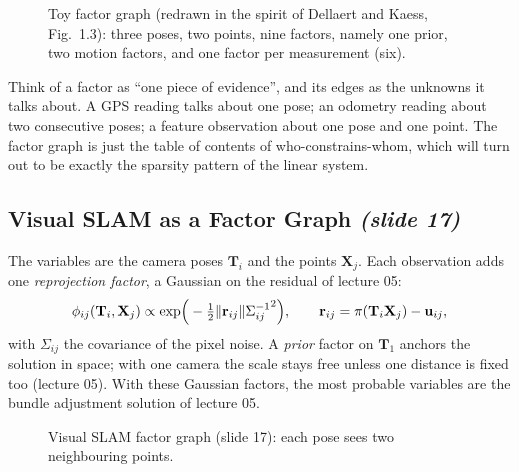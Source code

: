 \documentclass[11pt,a4paper]{article}
\newcommand{\slrs}[1]{\texorpdfstring{\emph{(slide #1)}}{(slide #1)}}
\newcommand{\bx}{\bm{x}}
\newcommand{\by}{\mathbf{y}}
\newcommand{\bX}{\mathbf{X}}
\newcommand{\bT}{\mathbf{T}}
\newcommand{\x}{{\bm{x}}}
\theoremstyle{definition}
\theoremstyle{plain}
\theoremstyle{remark}
\begin{document}
\begin{figure}[htbp]\centering
{}
\caption{Toy factor graph (redrawn in the spirit of Dellaert and Kaess, Fig.~1.3): three poses, two points, nine factors, namely one prior, two motion factors, and one factor per measurement (six).}
\end{figure}
\begin{intuition}
Think of a factor as ``one piece of evidence'', and its edges as the unknowns it talks about. A GPS reading talks about one pose; an odometry reading about two consecutive poses; a feature observation about one pose and one point. The factor graph is just the table of contents of who-constrains-whom, which will turn out to be exactly the sparsity pattern of the linear system.
\end{intuition}

\subsection{Visual SLAM as a Factor Graph \slrs{17}}
The variables are the camera poses $\bT_i$ and the points $\bX_j$. Each observation adds one \emph{reprojection factor}, a Gaussian on the residual of lecture 05:
\[
\phi_{ij}(\bT_i,\bX_j)\propto\exp\!\Big(-\tfrac12\norm{\mathbf r_{ij}}{\Sigma_{ij}^{-1}}^2\Big),\qquad
\mathbf r_{ij}=\pi(\bT_i\bX_j)-\mathbf u_{ij},
\]
with $\Sigma_{ij}$ the covariance of the pixel noise. A \emph{prior} factor on $\bT_1$ anchors the solution in space; with one camera the scale stays free unless one distance is fixed too (lecture 05). With these Gaussian factors, the most probable variables are the bundle adjustment solution of lecture 05.

\begin{figure}[htbp]\centering
{}
\caption{Visual SLAM factor graph (slide 17): each pose sees two neighbouring points.}
\end{figure}
\end{document}

